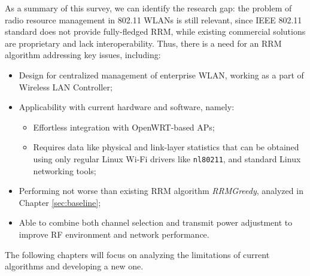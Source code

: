 As a summary of this survey, we can identify the research gap: the problem of radio resource management in 802.11 WLANs is still relevant, since IEEE 802.11 standard does not provide fully-fledged RRM, while existing commercial solutions are proprietary and lack interoperability. Thus, there is a need for an RRM algorithm addressing key issues, including:
\begin{itemize}
    \item Design for centralized management of enterprise WLAN, working as a part of Wireless LAN Controller;
    \item Applicability with current hardware and software, namely:
    \begin{itemize}
        \item Effortless integration with OpenWRT-based APs;
        \item Requires data like physical and link-layer statistics that can be obtained using only regular Linux Wi-Fi drivers like \texttt{nl80211}, and standard Linux networking tools;
    \end{itemize}
    \item Performing not worse than existing RRM algorithm \textit{RRMGreedy}, analyzed in Chapter \ref{sec:baseline};
    \item Able to combine both channel selection and transmit power adjustment to improve RF environment and network performance.
\end{itemize}

The following chapters will focus on analyzing the limitations of current algorithms and developing a new one.